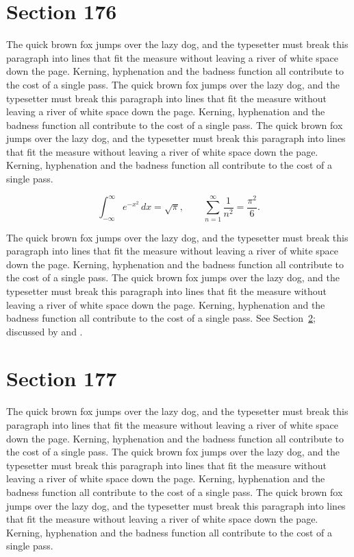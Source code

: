 \documentclass{article}
\begin{document}
\section{Section 176}
\label{sec:176}
The quick brown fox jumps over the lazy dog, and the typesetter must break this paragraph into lines that fit the measure without leaving a river of white space down the page. Kerning, hyphenation and the badness function all contribute to the cost of a single pass. The quick brown fox jumps over the lazy dog, and the typesetter must break this paragraph into lines that fit the measure without leaving a river of white space down the page. Kerning, hyphenation and the badness function all contribute to the cost of a single pass. The quick brown fox jumps over the lazy dog, and the typesetter must break this paragraph into lines that fit the measure without leaving a river of white space down the page. Kerning, hyphenation and the badness function all contribute to the cost of a single pass. 

\begin{equation}\label{eq:176}
\int_{-\infty}^{\infty} e^{-x^{2}}\,dx = \sqrt{\pi}, \qquad
\sum_{n=1}^{\infty} \frac{1}{n^{2}} = \frac{\pi^{2}}{6}.
\end{equation}

The quick brown fox jumps over the lazy dog, and the typesetter must break this paragraph into lines that fit the measure without leaving a river of white space down the page. Kerning, hyphenation and the badness function all contribute to the cost of a single pass. The quick brown fox jumps over the lazy dog, and the typesetter must break this paragraph into lines that fit the measure without leaving a river of white space down the page. Kerning, hyphenation and the badness function all contribute to the cost of a single pass. 
See Section~\ref{sec:177}; discussed by \textcite{k2} and \textcite{l4}.
\section{Section 177}
\label{sec:177}
The quick brown fox jumps over the lazy dog, and the typesetter must break this paragraph into lines that fit the measure without leaving a river of white space down the page. Kerning, hyphenation and the badness function all contribute to the cost of a single pass. The quick brown fox jumps over the lazy dog, and the typesetter must break this paragraph into lines that fit the measure without leaving a river of white space down the page. Kerning, hyphenation and the badness function all contribute to the cost of a single pass. The quick brown fox jumps over the lazy dog, and the typesetter must break this paragraph into lines that fit the measure without leaving a river of white space down the page. Kerning, hyphenation and the badness function all contribute to the cost of a single pass. 
\end{document}
